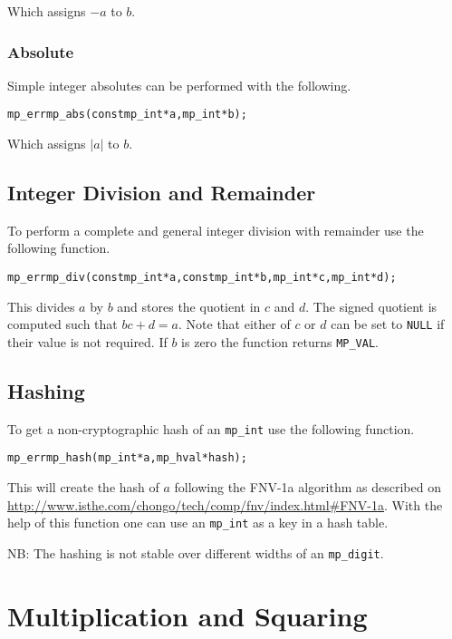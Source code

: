 \documentclass[synpaper]{book}
\begin{document}
Which assigns $-a$ to $b$.

\subsection{Absolute}
Simple integer absolutes can be performed with the following.

\begin{alltt}
mp_err mp_abs (const mp_int *a, mp_int *b);
\end{alltt}

Which assigns $\vert a \vert$ to $b$.

\section{Integer Division and Remainder}
To perform a complete and general integer division with remainder use the following function.

\begin{alltt}
mp_err mp_div (const mp_int *a, const mp_int *b, mp_int *c, mp_int *d);
\end{alltt}

This divides $a$ by $b$ and stores the quotient in $c$ and $d$.  The signed quotient is computed
such that $bc + d = a$.  Note that either of $c$ or $d$ can be set to \texttt{NULL} if their value
is not required.  If $b$ is zero the function returns \texttt{MP\_VAL}.

\section{Hashing}
To get a non-cryptographic hash of an \texttt{mp\_int} use the following function.

\begin{alltt}
mp_err mp_hash (mp_int *a, mp_hval *hash);
\end{alltt}

This will create the hash of $a$ following the \mbox{FNV-1a} algorithm as described on
\url{http://www.isthe.com/chongo/tech/comp/fnv/index.html#FNV-1a}. With the
help of this function one can use an \texttt{mp\_int} as a key in a hash table.

NB: The hashing is not stable over different widths of an \texttt{mp\_digit}.

\chapter{Multiplication and Squaring}
\end{document}
